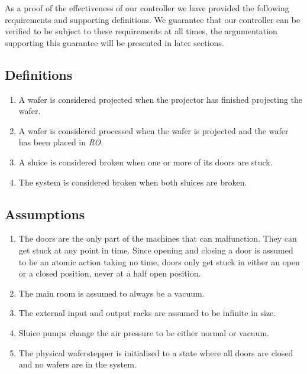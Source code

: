 
As a proof of the effectiveness of our controller we have provided the following requirements and supporting definitions. We guarantee that our controller can be verified to be subject to these requirements at all times, the argumentation supporting this guarantee will be presented in later sections.

\subsection{Definitions}
\begin{enumerate}
  \item A wafer is considered projected when the projector has finished projecting the wafer.
  \item A wafer is considered processed when the wafer is projected and the wafer has been placed in \textit{RO}.
  \item A sluice is considered broken when one or more of its doors are stuck.
  \item The system is considered broken when both sluices are broken.
\end{enumerate}

\subsection{Assumptions}
\begin{enumerate}
  \item The doors are the only part of the machines that can malfunction. They can get stuck at any point in time. Since opening and closing a door is assumed to be an atomic action taking no time, doors only get stuck in either an open or a closed position, never at a half open position.
  \item The main room is assumed to always be a vacuum.
  \item The external input and output racks are assumed to be infinite in size.
  \item Sluice pumps change the air pressure to be either normal or vacuum.
  \item The physical waferstepper is initialised to a state where all doors are closed and no wafers are in the system.
\end{enumerate}

